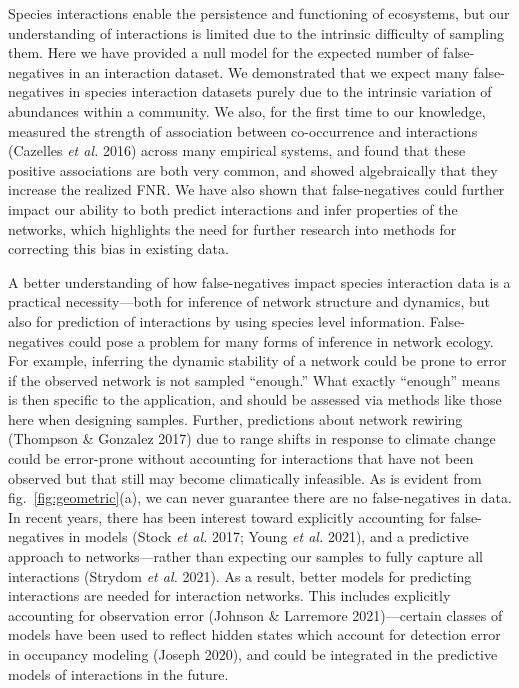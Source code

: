 \documentclass[10pt,oneside]{article}
\begin{document}
Species interactions enable the persistence and functioning of
ecosystems, but our understanding of interactions is limited due to the
intrinsic difficulty of sampling them. Here we have provided a null
model for the expected number of false-negatives in an interaction
dataset. We demonstrated that we expect many false-negatives in species
interaction datasets purely due to the intrinsic variation of abundances
within a community. We also, for the first time to our knowledge,
measured the strength of association between co-occurrence and
interactions (Cazelles \emph{et al.} 2016) across many empirical
systems, and found that these positive associations are both very
common, and showed algebraically that they increase the realized FNR. We
have also shown that false-negatives could further impact our ability to
both predict interactions and infer properties of the networks, which
highlights the need for further research into methods for correcting
this bias in existing data.

A better understanding of how false-negatives impact species interaction
data is a practical necessity---both for inference of network structure
and dynamics, but also for prediction of interactions by using species
level information. False-negatives could pose a problem for many forms
of inference in network ecology. For example, inferring the dynamic
stability of a network could be prone to error if the observed network
is not sampled ``enough.'' What exactly ``enough'' means is then
specific to the application, and should be assessed via methods like
those here when designing samples. Further, predictions about network
rewiring (Thompson \& Gonzalez 2017) due to range shifts in response to
climate change could be error-prone without accounting for interactions
that have not been observed but that still may become climatically
infeasible. As is evident from fig.~\ref{fig:geometric}(a), we can never
guarantee there are no false-negatives in data. In recent years, there
has been interest toward explicitly accounting for false-negatives in
models (Stock \emph{et al.} 2017; Young \emph{et al.} 2021), and a
predictive approach to networks---rather than expecting our samples to
fully capture all interactions (Strydom \emph{et al.} 2021). As a
result, better models for predicting interactions are needed for
interaction networks. This includes explicitly accounting for
observation error (Johnson \& Larremore 2021)---certain classes of
models have been used to reflect hidden states which account for
detection error in occupancy modeling (Joseph 2020), and could be
integrated in the predictive models of interactions in the future.
\end{document}
